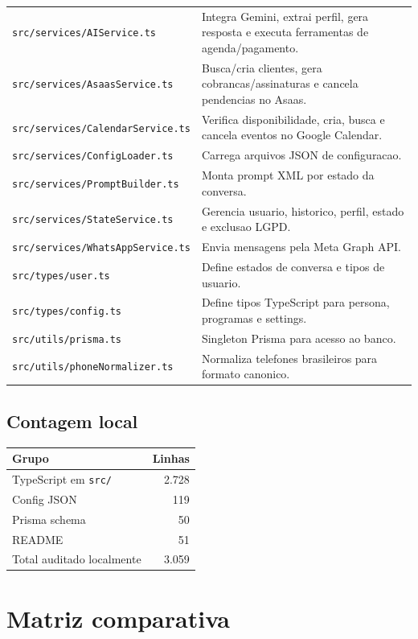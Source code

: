 \documentclass[11pt,a4paper]{article}
\begin{document}
\begin{longtable}{p{}p{}}
\texttt{src/services/AIService.ts} & Integra Gemini, extrai perfil, gera resposta e executa ferramentas de agenda/pagamento. \\
\texttt{src/services/AsaasService.ts} & Busca/cria clientes, gera cobrancas/assinaturas e cancela pendencias no Asaas. \\
\texttt{src/services/CalendarService.ts} & Verifica disponibilidade, cria, busca e cancela eventos no Google Calendar. \\
\texttt{src/services/ConfigLoader.ts} & Carrega arquivos JSON de configuracao. \\
\texttt{src/services/PromptBuilder.ts} & Monta prompt XML por estado da conversa. \\
\texttt{src/services/StateService.ts} & Gerencia usuario, historico, perfil, estado e exclusao LGPD. \\
\texttt{src/services/WhatsAppService.ts} & Envia mensagens pela Meta Graph API. \\
\texttt{src/types/user.ts} & Define estados de conversa e tipos de usuario. \\
\texttt{src/types/config.ts} & Define tipos TypeScript para persona, programas e settings. \\
\texttt{src/utils/prisma.ts} & Singleton Prisma para acesso ao banco. \\
\texttt{src/utils/phoneNormalizer.ts} & Normaliza telefones brasileiros para formato canonico. \\
\bottomrule
\end{longtable}

\subsection{Contagem local}

\begin{tabularx}{\textwidth}{Xr}
\toprule
\textbf{Grupo} & \textbf{Linhas} \\
\midrule
TypeScript em \texttt{src/} & 2.728 \\
Config JSON & 119 \\
Prisma schema & 50 \\
README & 51 \\
Total auditado localmente & 3.059 \\
\bottomrule
\end{tabularx}

\section{Matriz comparativa}
\end{document}
